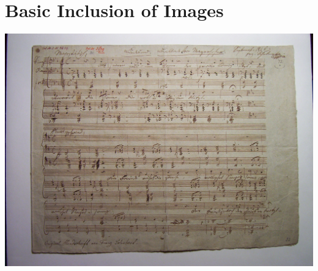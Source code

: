 \documentclass{scrartcl}
\begin{document}
\section{Basic Inclusion of Images}

\Blindtext[]

\includegraphics{media/schubert-d473}

\Blindtext[]
\end{document}
